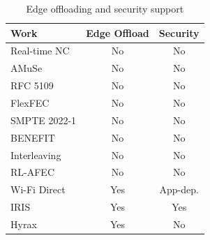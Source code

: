 \begin{table}[H]
	\centering
	\caption{Edge offloading and security support}
	\label{tab:rw-feature-edge}
	\small
	\renewcommand{\arraystretch}{1.15}
	\setlength{\tabcolsep}{4pt}
	\begin{tabular}{|l|c|c|}
		\hline
		\textbf{Work} & \textbf{Edge Offload} & \textbf{Security} \\
		\hline
		Real-time NC \cite{ferreira2019realtime} & No & No \\
		AMuSe \cite{amaldi2010amuse} & No & No \\
		RFC 5109 \cite{perkins2003rfc5109} & No & No \\
		FlexFEC \cite{perkins2019flexfec} & No & No \\
		SMPTE 2022-1 \cite{smpte2022} & No & No \\
		BENEFIT \cite{qureshi2011benefit} & No & No \\
		Interleaving \cite{adalier2009interleaving} & No & No \\
		RL-AFEC \cite{chen2018rlafec} & No & No \\
		Wi-Fi Direct \cite{sha2016wifidirect,poderys2017overlay,androidWFD} & Yes & App-dep. \\
		IRIS \cite{martins2018iris} & Yes & Yes \\
		Hyrax \cite{inesctec_hyrax} & Yes & No \\
		\hline
	\end{tabular}
\end{table}


